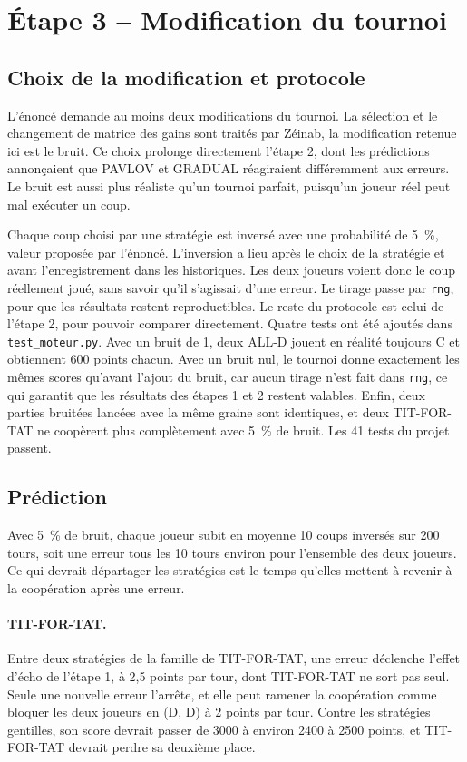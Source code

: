 \documentclass[11pt,a4paper]{article}
\begin{document}
\section{Étape 3 -- Modification du tournoi}
\subsection{Choix de la modification et protocole}
L'énoncé demande au moins deux modifications du tournoi. La sélection et le changement de matrice des gains sont traités par
Zéinab, la modification retenue ici est le bruit. Ce choix prolonge directement l'étape 2, dont les prédictions annonçaient que
PAVLOV et GRADUAL réagiraient différemment aux erreurs. Le bruit est aussi plus réaliste qu'un tournoi parfait, puisqu'un
joueur réel peut mal exécuter un coup.

Chaque coup choisi par une stratégie est inversé avec une probabilité de 5~\%, valeur proposée par l'énoncé. L'inversion a
lieu après le choix de la stratégie et avant l'enregistrement dans les historiques. Les deux joueurs voient donc le coup
réellement joué, sans savoir qu'il s'agissait d'une erreur. Le tirage passe par \texttt{rng}, pour que les résultats restent
reproductibles. Le reste du protocole est celui de l'étape 2, pour pouvoir comparer directement. Quatre tests ont été ajoutés
dans \texttt{test\_moteur.py}. Avec un bruit de 1, deux ALL-D jouent en réalité toujours C et obtiennent 600 points chacun.
Avec un bruit nul, le tournoi donne exactement les mêmes scores qu'avant l'ajout du bruit, car aucun tirage n'est fait dans
\texttt{rng}, ce qui garantit que les résultats des étapes 1 et 2 restent valables. Enfin, deux parties bruitées lancées avec
la même graine sont identiques, et deux TIT-FOR-TAT ne coopèrent plus complètement avec 5~\% de bruit. Les 41 tests du projet
passent.

\subsection{Prédiction}
Avec 5~\% de bruit, chaque joueur subit en moyenne 10 coups inversés sur 200 tours, soit une erreur tous les 10 tours environ
pour l'ensemble des deux joueurs. Ce qui devrait départager les stratégies est le temps qu'elles mettent à revenir à la
coopération après une erreur.

\paragraph{TIT-FOR-TAT.} Entre deux stratégies de la famille de TIT-FOR-TAT, une erreur déclenche l'effet d'écho de l'étape 1,
à 2,5 points par tour, dont TIT-FOR-TAT ne sort pas seul. Seule une nouvelle erreur l'arrête, et elle peut ramener la
coopération comme bloquer les deux joueurs en (D, D) à 2 points par tour. Contre les stratégies gentilles, son score devrait
passer de 3000 à environ 2400 à 2500 points, et TIT-FOR-TAT devrait perdre sa deuxième place.
\end{document}
